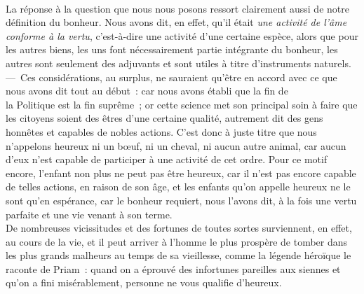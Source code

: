 \documentclass[french,twoside]{book} %
\begin{document}
\\
La réponse à la question que nous nous posons ressort clairement aussi de notre définition du bonheur. Nous avons dit, en effet, qu’il était {\itshape une activité de l’âme conforme à la vertu}, c’est-à-dire une activité d’une certaine espèce, alors que pour les autres biens, les uns font nécessairement partie intégrante du bonheur, les autres sont seulement des adjuvants et sont utiles à titre d’instruments naturels. — Ces considérations, au surplus, ne sauraient qu’être en accord avec ce que nous avons dit tout au début : car nous avons établi que la fin de \\
la Politique est la fin suprême ; or cette science met son principal soin à faire que les citoyens soient des êtres d’une certaine qualité, autrement dit des gens honnêtes et capables de nobles actions. C’est donc à juste titre que nous n’appelons heureux ni un bœuf, ni un cheval, ni aucun autre animal, car  aucun d’eux n’est capable de participer à une activité de cet ordre. Pour ce motif encore, l’enfant non plus ne peut pas être heureux, car il n’est pas encore capable de telles actions, en raison de son âge, et les enfants qu’on appelle heureux ne le sont qu’en espérance, car le bonheur requiert, nous l’avons dit, à la fois une vertu parfaite et une vie venant à son terme. \\
De nombreuses vicissitudes et des fortunes de toutes sortes surviennent, en effet, au cours de la vie, et il peut arriver à l’homme le plus prospère de tomber dans les plus grands malheurs au temps de sa vieillesse, comme la légende héroïque le raconte de Priam : quand on a éprouvé des infortunes pareilles aux siennes et qu’on a fini misérablement, personne ne vous qualifie d’heureux.
\end{document}
